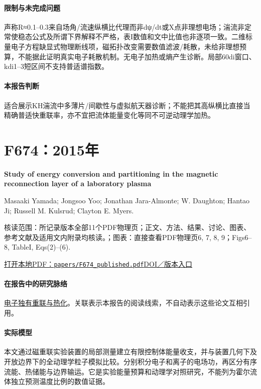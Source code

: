 \documentclass[UTF8,a4paper,11pt,openany,fontset=fandol]{ctexbook}
\begin{document}
\paragraph{限制与未完成问题}声称R≈0.1–0.3来自场角/流速纵横比代理而非dψ/dt或X点非理想电场；湍流非定常使稳态公式及所谓下界解释不严格，表I数值和文中比值也非逐项一致。二维标量电子方程缺显式物理断线项，磁拓扑改变需要数值滤波/耗散，未给非理想预算，不能据此证明真实电子耗散机制。无电子加热或熵产生诊断。局部60di窗口、kdi1–3短区间不支持普适谱指数。

\paragraph{本报告判断}适合展示KH湍流中多薄片/间歇性与虚拟航天器诊断；不能把其高纵横比直接当精确普适快重联率，亦不宜把流体能量变化等同不可逆动理学加热。

\section{F674：2015年}\label{paper:F674}

\textbf{Study of energy conversion and partitioning in the magnetic reconnection layer of a laboratory plasma}\citep{F674}\

Masaaki Yamada;  Jongsoo Yoo;  Jonathan Jara-Almonte;  W. Daughton;  Hantao Ji;  Russell M. Kulsrud;  Clayton E. Myers.

\textsf{核读范围：}所记录版本全部11个PDF物理页；正文、方法、结果、讨论、图表、参考文献及适用文内附录均核读。；\textsf{图表：}直接查看PDF物理页6, 7, 8, 9；Figs6–8,  TableI,  Eqs(2)–(6).

\href{run:../papers/F674_published.pdf}{打开本地PDF：\texttt{papers/F674\_published.pdf}}\quad\href{https://doi.org/10.1063/1.4920960}{DOI／版本入口}

\paragraph{在报告中的研究脉络}\hyperref[story:energy]{电子独有重联与热化}。关联表示本报告的阅读线索，不自动表示这些论文互相引用。

\paragraph{实际模型}本文通过磁重联实验装置的局部测量建立有限控制体能量收支，并与装置几何下及开放边界下的全动理学粒子模拟比较。分别积分电子和离子的电场功，再区分有序流能、热储能与边界输运。它是实验能量预算和动理学对照研究，不能列为霍尔流体独立预测温度比例的数值证据。
\end{document}
